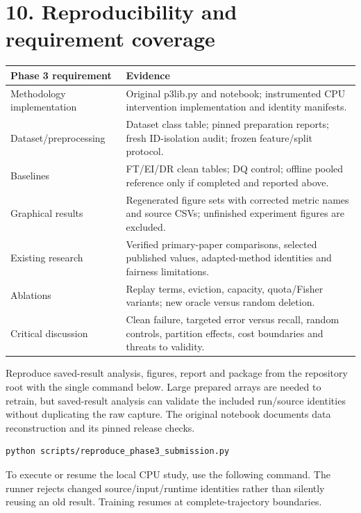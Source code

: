 \documentclass[
  10pt,
  a4paper,
]{article}
\begin{document}
\hypertarget{reproducibility-and-requirement-coverage}{%
\section{10. Reproducibility and requirement
coverage}\label{reproducibility-and-requirement-coverage}}

\begin{longtable}[]{@{}
  >{\raggedright\arraybackslash}p{}
  >{\raggedright\arraybackslash}p{}@{}}
\toprule
Phase 3 requirement & Evidence \\
\midrule
\endhead
Methodology implementation & Original p3lib.py and notebook;
instrumented CPU intervention implementation and identity manifests. \\
Dataset/preprocessing & Dataset class table; pinned preparation reports;
fresh ID-isolation audit; frozen feature/split protocol. \\
Baselines & FT/EI/DR clean tables; DQ control; offline pooled reference
only if completed and reported above. \\
Graphical results & Regenerated figure sets with corrected metric names
and source CSVs; unfinished experiment figures are excluded. \\
Existing research & Verified primary-paper comparisons, selected
published values, adapted-method identities and fairness limitations. \\
Ablations & Replay terms, eviction, capacity, quota/Fisher variants; new
oracle versus random deletion. \\
Critical discussion & Clean failure, targeted error versus recall,
random controls, partition effects, cost boundaries and threats to
validity. \\
\bottomrule
\end{longtable}

Reproduce saved-result analysis, figures, report and package from the
repository root with the single command below. Large prepared arrays are
needed to retrain, but saved-result analysis can validate the included
run/source identities without duplicating the raw capture. The original
notebook documents data reconstruction and its pinned release checks.

\begin{verbatim}
python scripts/reproduce_phase3_submission.py
\end{verbatim}

To execute or resume the local CPU study, use the following command. The
runner rejects changed source/input/runtime identities rather than
silently reusing an old result. Training resumes at complete-trajectory
boundaries.
\end{document}
